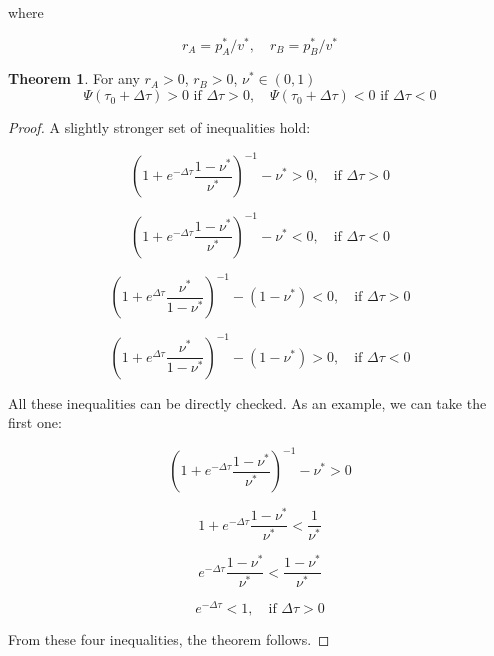 \documentclass{article}
\theoremstyle{definition}
\newtheorem{theorem}{Theorem}[section]
\begin{document}
where

\begin{equation}
    r_A = p^*_A / v^*, \quad r_B = p^*_B / v^*
\end{equation}

\begin{theorem}
    For any $r_A >0$, $r_B >0$, $\nu^* \in (0,1)$
    \begin{equation}
        \Psi(\tau_0 + \Delta \tau) > 0 \text{ if } \Delta \tau >0, \quad \Psi(\tau_0 + \Delta \tau) < 0 \text{ if } \Delta \tau <0
    \end{equation}
\end{theorem}

\begin{proof}
    A slightly stronger set of inequalities hold:

    \begin{equation}
        \left ( 1 + e^{-\Delta \tau} \frac{1-\nu^*}{\nu^*}\right )^{-1} - \nu^* > 0, \quad \text{if } \Delta \tau>0 
    \end{equation}
    
    \begin{equation}
        \left ( 1 + e^{-\Delta \tau} \frac{1-\nu^*}{\nu^*}\right )^{-1} - \nu^* < 0, \quad \text{if } \Delta \tau<0
    \end{equation}

    \begin{equation}
        \left ( 1 + e^{\Delta \tau} \frac{\nu^*}{1-\nu^*}\right )^{-1} - (1-\nu^*) < 0, \quad \text{if } \Delta \tau>0
    \end{equation}

        \begin{equation}
        \left ( 1 + e^{\Delta \tau} \frac{\nu^*}{1-\nu^*}\right )^{-1} - (1-\nu^*) > 0, \quad \text{if } \Delta \tau<0
    \end{equation}

    All these inequalities can be directly checked. As an example, we can take the first one:

    \begin{equation}
        \left ( 1 + e^{-\Delta \tau} \frac{1-\nu^*}{\nu^*}\right )^{-1} - \nu^* > 0
    \end{equation}
    
    \begin{equation}
        1 + e^{-\Delta \tau} \frac{1-\nu^*}{\nu^*} < \frac{1}{\nu^*} 
    \end{equation}

    \begin{equation}
        e^{-\Delta \tau} \frac{1-\nu^*}{\nu^*} < \frac{1-\nu^*}{\nu^*} 
    \end{equation}

    \begin{equation}
        e^{-\Delta \tau}  < 1, \quad \text{if } \Delta \tau > 0
    \end{equation}

    From these four inequalities, the theorem follows.

\end{proof}
\end{document}
